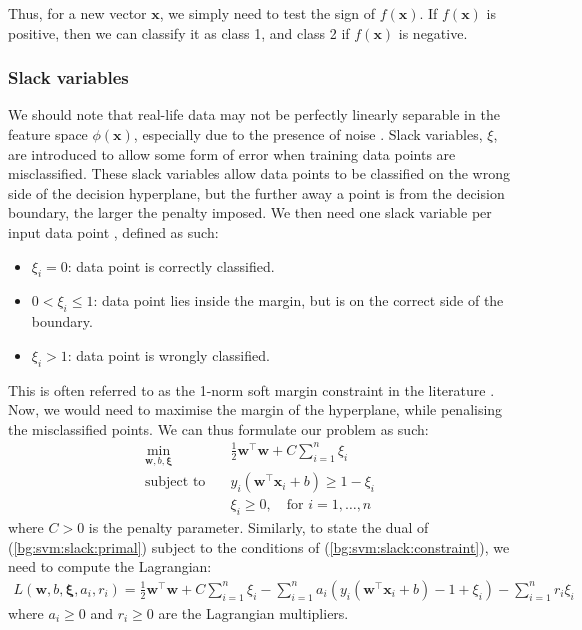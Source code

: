 \documentclass[12pt, twoside, a4paper]{article}
\def\vec{\boldsymbol}
\begin{document}
Thus, for a new vector $\vec{x}$, we simply need to test the sign of $f(\vec{x})$. If $f(\vec{x})$ is positive, then we can classify it as class 1, and class 2 if $f(\vec{x})$ is negative.

\subsubsection{Slack variables}
We should note that real-life data may not be perfectly linearly separable in the feature space $\phi(\vec{x})$, especially due to the presence of noise \cite{RefWorks:127}. Slack variables, $\xi$, are introduced to allow some form of error when training data points are misclassified. These slack variables allow data points to be classified on the wrong side of the decision hyperplane, but the further away a point is from the decision boundary, the larger the penalty imposed. We then need one slack variable per input data point \cite{RefWorks:126}, defined as such:
\begin{itemize}
\item $\xi_i = 0$: data point is correctly classified.
\item $0 < \xi_i \leq 1$: data point lies inside the margin, but is on the correct side of the boundary.
\item $\xi_i > 1$: data point is wrongly classified.
\end{itemize}

This is often referred to as the 1-norm soft margin constraint in the literature \cite{RefWorks:127}. Now, we would need to maximise the margin of the hyperplane, while penalising the misclassified points. We can thus formulate our problem as such:
\begin{align}
\min_{\vec{w}, b, \vec{\xi}} \quad &\frac{1}{2}\vec{w}^\top \vec{w} + C \sum_{i=1}^n \xi_i \label{bg:svm:slack:primal} \\
\text{subject to} \quad &y_i(\vec{w}^\top \vec{x}_i + b) \geq 1 - \xi_i \label{bg:svm:slack:constraint} \\
&\xi_i \geq 0, \quad \text{for $i = 1, \dots , n$}
\end{align}
where $C>0$ is the penalty parameter. Similarly, to state the dual of (\ref{bg:svm:slack:primal}) subject to the conditions of (\ref{bg:svm:slack:constraint}), we need to compute the Lagrangian:
\begin{align*}
L(\vec{w}, b, \vec{\xi}, a_i, r_i) =
\frac{1}{2} \vec{w}^\top \vec{w} + C \sum_{i=1}^n \xi_i - \sum_{i=1}^n a_i(y_i(\vec{w}^\top \vec{x}_i + b) - 1 + \xi_i) - \sum_{i=1}^n r_i\xi_i
\end{align*}
where $a_i \geq 0$ and $r_i \geq 0$ are the Lagrangian multipliers.
\end{document}
